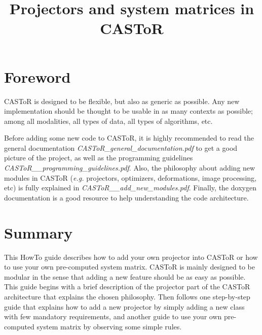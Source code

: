 \documentclass[a4paper, 11pt]{article}
\begin{document}
\title{Projectors and system matrices in CASToR}
\maketitle

\section*{Foreword}

CASToR is designed to be flexible, but also as generic as possible.
Any new implementation should be thought to be usable in as many contexts as possible; among all modalities, all types of data, all types of algorithms, etc.

Before adding some new code to CASToR, it is highly recommended to read the general documentation \textit{CASToR\_general\_documentation.pdf} to get a good picture of the project, as well as the programming guidelines \textit{CASToR\_\_programming\_guidelines.pdf}.
Also, the philosophy about adding new modules in CASToR (\textit{e.g.} projectors, optimizers, deformations, image processing, etc) is fully explained in \textit{CASToR\_\_add\_new\_modules.pdf}.
Finally, the doxygen documentation is a good resource to help understanding the code architecture.

\section{Summary}

This HowTo guide describes how to add your own projector into CASToR or how to use your own pre-computed system matrix. CASToR is mainly designed to be modular
in the sense that adding a new feature should be as easy as possible. This guide begins with a brief description of the projector part of the CASToR architecture
that explains the chosen philosophy. Then follows one step-by-step guide that explains how to add a new projector by simply adding a new class with few mandatory
requirements, and another guide to use your own pre-computed system matrix by observing some simple rules.

\end{document}
